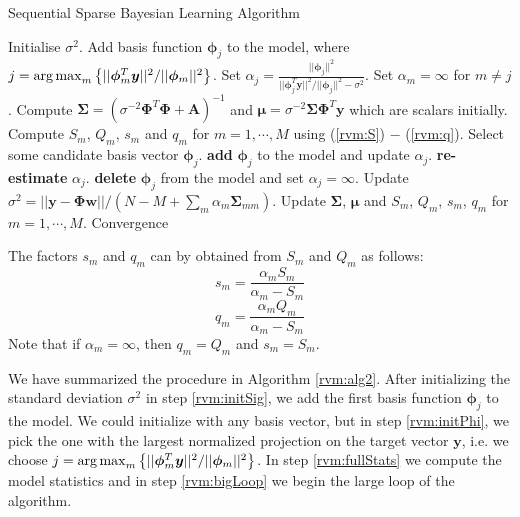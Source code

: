 \begin{algorithm}
  \caption{Sequential Sparse Bayesian Learning Algorithm \cite{tipping2003}}
  \label{rvm:alg2}
  \begin{algorithmic}[1]
    \State Initialise $\sigma^2$.\label{rvm:initSig}
    \State Add basis function $\bm\phi_j$ to the model, where $j = \operatorname*{arg\,max}_m \left\{||\bm\phi_m^T\bm y||^2/||\bm\phi_m||^2\right\}$.\label{rvm:initPhi}
    \Statex Set $\alpha_j = \frac{||\bm\phi_j||^2}{||\bm\phi_j^T\bm y||^2/||\bm\phi_j||^2 - \sigma^2}$. Set $\alpha_m = \infty$ for $m\neq j$.
    \State Compute $\bm\Sigma = \left(\sigma^{-2}\bm\Phi^T\bm\Phi + \bm A\right)^{-1}$ and $\bm\mu = \sigma^{-2}\bm\Sigma\bm\Phi^T\bm y$ which are scalars initially.\label{rvm:fullStats}
    \Statex Compute $S_m$, $Q_m$, $s_m$ and $q_m$ for $m = 1,\cdots,M$ using (\ref{rvm:S}) $-$ (\ref{rvm:q}). %
    \Repeat\label{rvm:bigLoop}
    \State Select some candidate basis vector $\bm\phi_j$.\label{rvm:select}
     \textbf{add} $\bm\phi_j$ to the model and update $\alpha_j$. \EndIIf\label{rvm:add}
     \textbf{re-estimate} $\alpha_j$. \EndIIf\label{rvm:reestimate}
     \textbf{delete} $\bm\phi_j$ from the model and set $\alpha_j=\infty$. \EndIIf\label{rvm:delete}
    \State Update $\sigma^2 = ||\bm y - \bm\Phi\bm w||/(N-M+\sum_m\alpha_m\bm\Sigma_{mm})$\label{rvm:noise}\cite{tipping2001}.
    \State Update $\bm\Sigma$, $\bm\mu$ and $S_m$, $Q_m$, $s_m$, $q_m$ for $m = 1,\cdots, M$.\label{rvm:update}
    \Until Convergence
  \end{algorithmic}
\end{algorithm}

The factors $s_m$ and $q_m$ can by obtained from $S_m$ and $Q_m$ as follows:
\begin{equation}
  \label{rvm:s}
  s_m = \frac{\alpha_m S_m}{\alpha_m - S_m}
\end{equation}
\begin{equation}
  \label{rvm:q}
  q_m = \frac{\alpha_m Q_m}{\alpha_m - S_m}
\end{equation}
Note that if $\alpha_m = \infty$, then $q_m = Q_m$ and $s_m = S_m$.

We have summarized the procedure in Algorithm \ref{rvm:alg2}.
After initializing the standard deviation $\sigma^2$ in step \ref{rvm:initSig}, we add the first basis function $\bm\phi_j$ to the model. 
We could initialize with any basis vector, but in step \ref{rvm:initPhi}, we pick the one with the largest normalized projection on the target vector $\bm y$, i.e. we choose  $j = \operatorname*{arg\,max}_m \left\{||\bm\phi_m^T\bm y||^2/||\bm\phi_m||^2\right\}$.
In step \ref{rvm:fullStats} we compute the model statistics and in step \ref{rvm:bigLoop} we begin the large loop of the algorithm.

